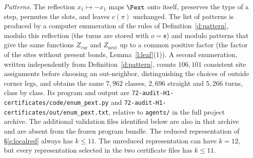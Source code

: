 \emph{Patterns.} The reflection $x_1 \mapsto -x_1$ maps $\Pext$ onto itself, preserves the type of a step, permutes the slots, and leaves $c(\pi)$ unchanged. The list of patterns is produced by a computer enumeration of the rules of Definition~\ref{d:pattern}, modulo this reflection (the turns are stored with $o = \mathsf e$) and modulo patterns that give the same functions $Z_{\mathrm{cur}}$ and $Z_{\mathrm{next}}$ up to a common positive factor (the factor of the sites without present bonds, Lemma~\ref{l:leaf}(1)). A second enumeration, written independently from Definition~\ref{d:pattern}, counts $106{,}101$ consistent site assignments before choosing an out-neighbor, distinguishing the choices of outside corner legs, and obtains the same $7{,}962$ classes, $2{,}696$ straight and $5{,}266$ turns, class by class. Its program and output are \texttt{72-\allowbreak audit-\allowbreak H1-\allowbreak certificates/\allowbreak code/\allowbreak enum\_\allowbreak pext.py} and \texttt{72-\allowbreak audit-\allowbreak H1-\allowbreak certificates/\allowbreak out/\allowbreak enum\_\allowbreak pext.txt}, relative to \texttt{agents/\allowbreak } in the full project archive. The additional validation files identified below are also in that archive and are absent from the frozen program bundle. The reduced representation of \S\ref{s:localred} always has $k \le 11$. The unreduced representation can have $k = 12$, but every representation selected in the two certificate files has $k \le 11$.

